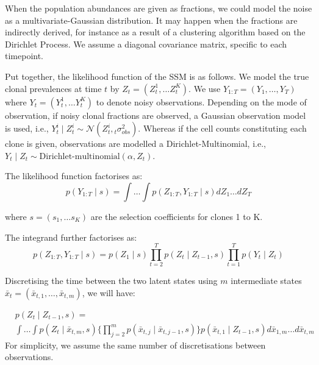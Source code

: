\documentclass{article}
\begin{document}
When the population abundances are given as fractions, we could model the noise as a multivariate-Gaussian distribution.
It may happen when the fractions are indirectly derived, for instance as a result of a clustering algorithm based on the Dirichlet Process.
We assume a diagonal covariance matrix, specific to each timepoint. 


Put together, the likelihood function of the SSM is as follows.
We model the true clonal prevalences at time $t$ by $Z_t = (Z_t^1, \ldots Z_t^K)$.
We use $Y_{1:T} = (Y_1, \ldots, Y_T)$ where $Y_t = (Y_t^1, \ldots Y_t^K)$ to denote noisy observations.
Depending on the mode of observation, if noisy clonal fractions are observed, a Gaussian observation model is used, i.e., $Y_t^i  \mid Z_t^i \sim \mathcal{N}(Z_t^i, {}_{t}\sigma_{obs}^2)$.
Whereas if the cell counts constituting each clone is given, observations are modelled a Dirichlet-Multinomial, i.e., $Y_t  \mid Z_t \sim \text{Dirichlet-multinomial}(\alpha, Z_t)$.


The likelihood function factorises as:
\begin{equation} \label{eq:likelihood}
p(Y_{1:T} \mid s) = \int \ldots \int p(Z_{1:T}, Y_{1:T} \mid s) dZ_1 \ldots dZ_T
\end{equation}

where $s = (s_1, \ldots s_K) $ are the selection coefficients for clones 1 to K.

The integrand further factorises as:
\begin{equation} \label{eq:likelihood1}
p(Z_{1:T}, Y_{1:T} \mid s) =   p(Z_1 \mid s) \prod_{t=2}^T p(Z_t \mid Z_{t-1}, s)  \prod_{t=1}^T p(Y_{t} \mid Z_t)
\end{equation}

Discretising the time between the two latent states using $m$ intermediate states $\bar{x}_t = (\bar{x}_{t,1}, \ldots, \bar{x}_{t, m})$, we will have:

\begin{align*} \label{eq:rejuvenationtarget}
& p(Z_t \mid Z_{t-1}, s) = \\ 
& \int \ldots \int p(Z_t \mid \bar{x}_{t, m}, s)  \{  \prod_{j=2}^{m} p(\bar{x}_{t,j} \mid \bar{x}_{t,j-1} , s)  \} p(\bar{x}_{t,1} \mid Z_{t-1}, s) d\bar{x}_{1,m}  \ldots d\bar{x}_{t,m}
\end{align*}
For simplicity, we assume the same number of discretisations between observations.
\end{document}
